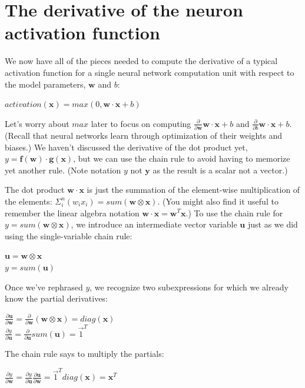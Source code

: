 \documentclass[11pt]{article}
\begin{document}
\section{The derivative of the neuron activation function}

We now have all of the pieces needed to compute the derivative of a typical activation function for a single neural network computation unit with respect to the model parameters, $\mathbf{w}$ and $b$:

$activation(\mathbf{x}) = max(0, \mathbf{w} \cdot \mathbf{x} + b)$

Let's worry about $max$ later to focus on computing $\frac{\partial}{\partial \mathbf{w}} \mathbf{w} \cdot \mathbf{x} + b$ and $\frac{\partial}{\partial b} \mathbf{w} \cdot \mathbf{x} + b$. (Recall that neural networks learn through optimization of their weights and biases.)  We haven't discussed the derivative of the dot product yet, $y = \mathbf{f(w)} \cdot \mathbf{g(x)}$, but we can use the chain rule to avoid having to memorize yet another rule. (Note notation $y$ not $\mathbf{y}$ as the result is a scalar not a vector.) 

The dot product $\mathbf{w} \cdot \mathbf{x}$ is just the summation of the element-wise multiplication of the elements: $\Sigma_i^n (w_i x_i) = sum(\mathbf{w} \otimes \mathbf{x})$. (You might also find it useful to remember the linear algebra notation $\mathbf{w} \cdot \mathbf{x} = \mathbf{w}^{T} \mathbf{x}$.) To use the chain rule for $y = sum(\mathbf{w} \otimes \mathbf{x})$, we introduce an intermediate vector variable $\mathbf{u}$ just as we did using the single-variable chain rule:

$\mathbf{u} = \mathbf{w} \otimes \mathbf{x}$\\
$y = sum(\mathbf{u})$

Once we've rephrased $y$, we recognize two subexpressions for which we already know the partial derivatives:

$\frac{\partial  \mathbf{u}}{\partial \mathbf{w}} = \frac{\partial }{\partial \mathbf{w}} (\mathbf{w} \otimes \mathbf{x}) = diag(\mathbf{x})$\\
$\frac{\partial y}{\partial \mathbf{u}} = \frac{\partial }{\partial \mathbf{u}} sum(\mathbf{u}) = \vec{1}^T$

The chain rule says to multiply the partials:

$\frac{\partial y}{\partial \mathbf{w}} = \frac{\partial y}{\partial \mathbf{u}} \frac{\partial \mathbf{u}}{\partial \mathbf{w}} = \vec{1}^T  diag(\mathbf{x}) = \mathbf{x}^T$
\end{document}
